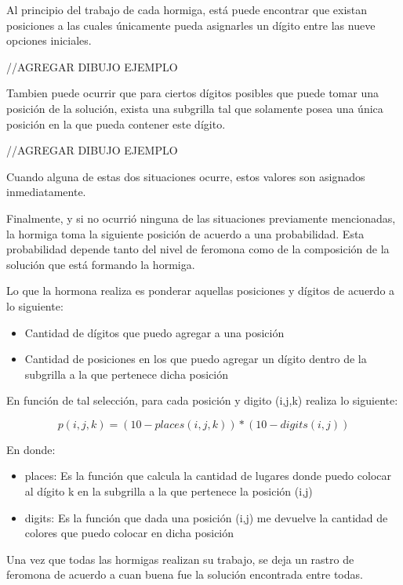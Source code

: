 \documentclass[a4paper,spanish]{article}
\begin{document}
Al principio del trabajo de cada hormiga, está puede encontrar que existan posiciones a las cuales únicamente pueda asignarles 
un dígito entre las nueve opciones iniciales.

//AGREGAR DIBUJO EJEMPLO

Tambien puede ocurrir que para ciertos dígitos posibles que puede tomar una posición de la solución, exista una subgrilla tal que 
solamente posea una única posición en la que pueda contener este dígito.

//AGREGAR DIBUJO EJEMPLO

Cuando alguna de estas dos situaciones ocurre, estos valores son asignados inmediatamente.

Finalmente, y si no ocurrió ninguna de las situaciones previamente mencionadas, la hormiga toma la siguiente posición de acuerdo 
a una probabilidad. Esta probabilidad depende tanto del nivel de feromona como de la composición de la solución que está formando la hormiga.

Lo que la hormona realiza es ponderar aquellas posiciones y dígitos de acuerdo a lo siguiente:

\begin{itemize}
	\item Cantidad de dígitos que puedo agregar a una posición
	\item Cantidad de posiciones en los que puedo agregar un dígito dentro de la subgrilla a la que pertenece dicha posición
\end{itemize}

En función de tal selección, para cada posición y digito (i,j,k) realiza lo siguiente:

\begin{equation}
	p(i,j,k)=(10-places(i,j,k))*(10-digits(i,j))	
\end{equation}

En donde:

\begin{itemize}
	\item places: Es la función que calcula la cantidad de lugares donde puedo colocar al dígito k en la subgrilla a la que pertenece la posición (i,j)
	\item digits: Es la función que dada una posición (i,j) me devuelve la cantidad de colores que puedo colocar en dicha posición
\end{itemize}


Una vez que todas las hormigas realizan su trabajo, se deja un rastro de feromona de acuerdo a cuan buena fue la solución encontrada entre todas.
\end{document}
